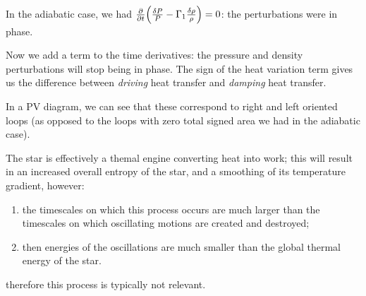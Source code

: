 \documentclass[main.tex]{subfiles}
\begin{document}
In the adiabatic case, we had \(\pdv{}{t}\qty( \frac{\delta P}{P} - \Gamma_1 \frac{\delta \rho}{\rho}) =0 \): the perturbations were in phase.

Now we add a term to the time derivatives: the pressure and density perturbations will stop being in phase. The sign of the heat variation term gives us the difference between \emph{driving} heat transfer and \emph{damping} heat transfer.

In a PV diagram, we can see that these correspond to right and left oriented loops (as opposed to the loops with zero total signed area we had in the adiabatic case).

\begin{bluebox}
    The star is effectively a themal engine converting heat into work; this will result in an increased overall entropy of the star, and a smoothing of its temperature gradient, however:
    \begin{enumerate}
        \item the timescales on which this process occurs are much larger than the timescales on which oscillating motions are created and destroyed;
        \item then energies of the oscillations are much smaller than the global thermal energy of the star.
    \end{enumerate}
    therefore this process is typically not relevant.
\end{bluebox}
\end{document}
